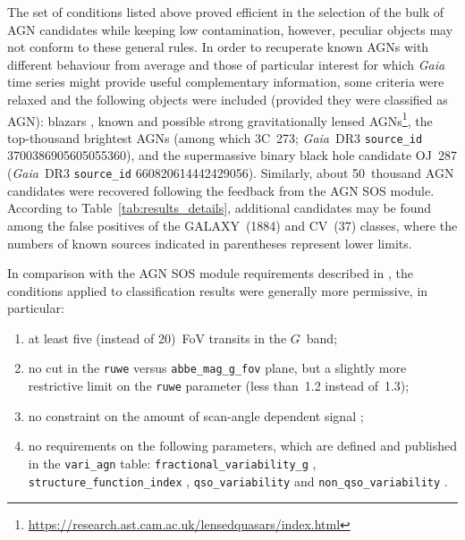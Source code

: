 \documentclass[longauth]{aa}
\def\gaia{\textit{Gaia}\xspace}
\def\g{$G$\xspace}
\begin{document}
The set of conditions listed above proved efficient in the selection of the bulk of AGN candidates while keeping low contamination, however, peculiar objects may not conform to these general rules. In order to recuperate known AGNs with different behaviour from average and those of particular interest for which \gaia time series might provide useful complementary information, some criteria were relaxed and the following objects were included (provided they were classified as AGN): blazars \citep{2015Ap&SS.357...75M,2018MNRAS.478.1512B,2017A&A...598A..17C}, known and possible strong gravitationally lensed AGNs\footnote{\url{https://research.ast.cam.ac.uk/lensedquasars/index.html}}, the top-thousand brightest AGNs (among which 3C~273; \gaia~DR3 \texttt{source\_id} 3700386905605055360), and the supermassive binary black hole candidate OJ~287 (\gaia~DR3 \texttt{source\_id} 660820614442429056). 
Similarly, about 50~thousand AGN candidates were recovered following the feedback from the AGN SOS module.
According to Table~\ref{tab:results_details}, additional candidates may be found among the false positives of the GALAXY~(1884) and CV~(37) classes, where the numbers of known sources indicated in parentheses represent lower limits.

In comparison with the AGN SOS module requirements described in \citet{DR3-DPACP-167}, the conditions applied to classification results were generally more permissive, in particular:
\begin{enumerate}
    \item at least five (instead of 20)~FoV transits in the \g~band;
    \item no cut in the \texttt{ruwe} versus \texttt{abbe\_mag\_g\_fov} plane, but a slightly more restrictive limit on the \texttt{ruwe} parameter (less than~1.2 instead of~1.3);
    \item no constraint on the amount of scan-angle dependent signal \citep{DR3-DPACP-164};
    \item no requirements on the following parameters, which are defined and published in the \texttt{vari\_agn} table:
        \texttt{fractional\_variability\_g} \citep{2003MNRAS.345.1271V}, 
        \texttt{structure\_function\_index} \citep{1985ApJ...296...46S},
        \texttt{qso\_variability} and \texttt{non\_qso\_variability} \citep{2011AJ....141...93B}.
\end{enumerate}
\end{document}
